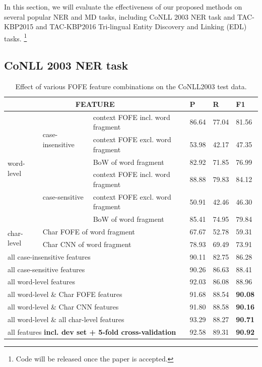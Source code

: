 \documentclass[11pt,a4paper]{article}
\begin{document}
In this section, we will evaluate the effectiveness of our proposed methods on several popular NER and MD tasks, including CoNLL 2003 NER task and 
TAC-KBP2015 and TAC-KBP2016 Tri-lingual Entity Discovery and Linking (EDL) tasks.
\footnote{Code will be released once the paper is accepted.}

\subsection{CoNLL 2003 NER task}

\begin{table}[h!]
	\centering
	\begin{tabular}{|l|l|l|lll|}
		\hline
		\multicolumn{3}{|c|}{FEATURE} & P & R & F1\\
		\hline\hline
		\multirow{6}{*}{word-level} & 
		\multirow{3}{*}{case-insensitive} &
		context FOFE incl. word fragment & 86.64 & 77.04 & 81.56 \\
		& &context FOFE excl. word fragment & 53.98 & 42.17 & 47.35  \\
		& & BoW of word fragment & 82.92 & 71.85 & 76.99  \\ \cline{2-6} 
		& \multirow{3}{*}{case-sensitive} & 
		context FOFE incl. word fragment & 88.88 & 79.83 &84.12  \\
		& &context FOFE excl. word fragment & 50.91 & 42.46 & 46.30  \\
		& & BoW of word fragment & 85.41 & 74.95 & 79.84  \\ \hline
		\multirow{2}{*}{char-level} &
		\multicolumn{2}{l|}{Char FOFE of word fragment} & 67.67 & 52.78 & 59.31  \\
		& \multicolumn{2}{l|}{Char CNN of word fragment} & 78.93 & 69.49 & 73.91 \\ \hline
		\multicolumn{3}{|l|}{all case-insensitive features} &  90.11 & 82.75 &  86.28  \\ 
		\multicolumn{3}{|l|}{all case-sensitive features} & 90.26 & 86.63 & 88.41 \\ 
		\multicolumn{3}{|l|}{all word-level features} & 92.03 & 86.08 & 88.96  \\ \hline
		\multicolumn{3}{|l|}{all word-level \& Char FOFE features} & 91.68 &  88.54 & \bf 90.08 \\
		\multicolumn{3}{|l|}{all word-level \& Char CNN features} & 91.80 & 88.58 & \bf 90.16 \\ \hline
		\multicolumn{3}{|l|}{all word-level \& all char-level features}  & 93.29 &  88.27 &  \bf 90.71  \\
		\multicolumn{3}{|l|}{all features \bf{incl. dev set} + 5-fold cross-validation} & 92.58 &  89.31 &  \bf 90.92  \\
		\hline
	\end{tabular}
	\caption{Effect of various FOFE feature combinations on the CoNLL2003 test data.}
	\label{tbl:feat-cmp:CoNLL03}
\end{table}
\end{document}
